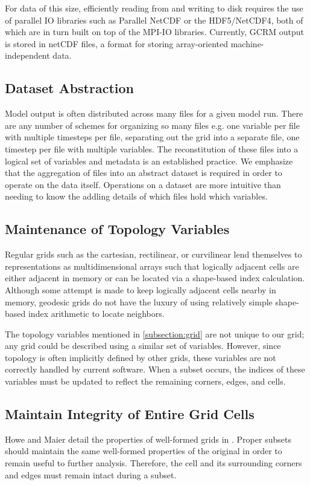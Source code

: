 For data of this size, efficiently reading from and writing to disk requires
the use of parallel IO libraries such as Parallel NetCDF\cite{PNETCDF} or the
HDF5/NetCDF4\cite{HDF5}\cite{NETCDF}, both of which are in turn built on top
of the MPI-IO libraries\cite{MPIIO}.  Currently, GCRM output is stored in
netCDF\cite{NETCDF} files, a format for storing array-oriented
machine-independent data.

\subsection{Dataset Abstraction}

Model output is often distributed across many files for a given model run.
There are any number of schemes for organizing so many files e.g. one variable
per file with multiple timesteps per file, separating out the grid into a
separate file, one timestep per file with multiple variables.  The
reconstitution of these files into a logical set of variables and metadata is
an established practice.\cite{NcML}\cite{THREDDS}  We emphasize that the
aggregation of files into an abstract dataset is required in order to operate
on the data itself.  Operations on a dataset are more intuitive than needing
to know the addling details of which files hold which variables.

\subsection{Maintenance of Topology Variables}

Regular grids such as the cartesian, rectilinear, or curvilinear lend
themselves to representations as multidimensional arrays such that logically
adjacent cells are either adjacent in memory or can be located via a
shape-based index calculation.  Although some attempt is made to keep
logically adjacent cells nearby in memory, geodesic grids do not have the
luxury of using relatively simple shape-based index arithmetic to locate
neighbors.

The topology variables mentioned in \ref{subsection:grid} are not unique to
our grid; any grid could be described using a similar set of variables.
However, since topology is often implicitly defined by other grids, these
variables are not correctly handled by current software.  When a subset
occurs, the indices of these variables must be updated to reflect the
remaining corners, edges, and cells.

\subsection{Maintain Integrity of Entire Grid Cells}

Howe and Maier detail the properties of well-formed grids in \cite{UGRID}.
Proper subsets should maintain the same well-formed properties of the original
in order to remain useful to further analysis.  Therefore, the cell and its
surrounding corners and edges must remain intact during a subset.
